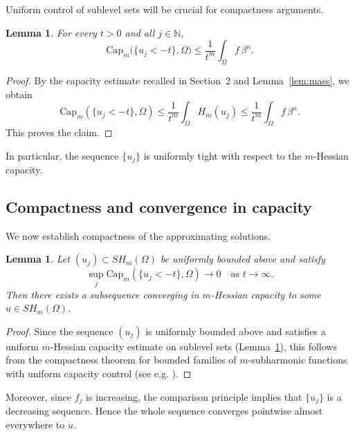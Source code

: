 \documentclass[10pt,a4paper]{amsart}
\newtheorem{lemma}[theorem]{Lemma}
\begin{document}
	Uniform control of sublevel sets will be crucial for compactness arguments.
	
	\begin{lemma}\label{lem:capacity}
		 For every $t>0$ and all $j \in \mathbb{N}$,
		\[
		\mathrm{Cap}_m\big(\{u_j < -t\}, \Omega\big)
		\le \frac{1}{t^m} \int_\Omega f \, \beta^n.
		\]
	\end{lemma}
	
	\begin{proof}
		By the capacity estimate recalled in Section~2 and Lemma~\ref{lem:mass}, we obtain
		\[
		\mathrm{Cap}_m(\{u_j<-t\},\Omega)
		\le \frac{1}{t^m} \int_\Omega H_m(u_j)
		\le \frac{1}{t^m} \int_\Omega f \, \beta^n.
		\]
		This proves the claim.
	\end{proof}
	
	In particular, the sequence $\{u_j\}$ is uniformly tight with respect to the $m$-Hessian capacity.
	
	
	\subsection{Compactness and convergence in capacity}
	
	We now establish compactness of the approximating solutions.
	
	\begin{lemma}\label{lem:compact}
		Let $(u_j)\subset SH_m(\Omega)$ be uniformly bounded above and satisfy
		\[
		\sup_j \mathrm{Cap}_m(\{u_j<-t\},\Omega)\to 0 \quad \text{as } t\to\infty.
		\]
		Then there exists a subsequence converging in $m$-Hessian capacity
		to some $u\in SH_m(\Omega)$.
	\end{lemma}
	
	\begin{proof}
		Since the sequence $(u_j)$ is uniformly bounded above and satisfies
		a uniform $m$-Hessian capacity estimate on sublevel sets
		(Lemma~\ref{lem:capacity}), this follows from the compactness theorem for bounded families
		of $m$-subharmonic functions with uniform capacity control
		(see e.g. \cite{DinewKolodziej2014}).
	\end{proof}
	
	
	Moreover, since $f_j$ is increasing, the comparison principle implies that $\{u_j\}$ is a decreasing sequence.
	Hence the whole sequence converges pointwise almost everywhere to $u$.
	
	
\end{document}
